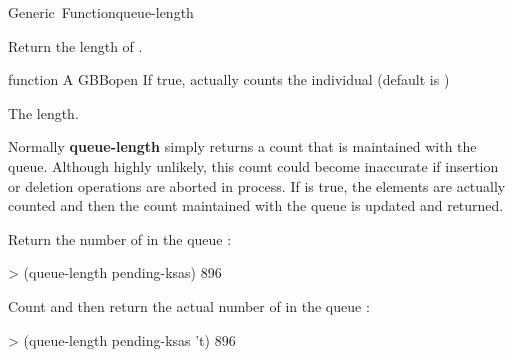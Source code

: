 \documentclass[10pt,twoside,english,pdftex]{article}
\begin{document}
\begin{functiondoc}{Generic~Function}{queue-length}{
      
    \returns{} }
%
%

\fnsyntax

\fnpurpose Return the length of .

\fnmethods
{} 

\fnpackage {}

\fnmodule {}

\fnargs
\begin{args}{function}
\arg[queue] A GBBopen 
\arg[recount-p] If true, actually counts the individual
 (default is \nil) 
\end{args}

\fnreturns The  length.

\fndescription Normally \textbf{queue-length} simply returns a count
that is maintained with the queue.  Although highly unlikely, this
count could become inaccurate if  insertion or
deletion operations are aborted in process. If  is
true, the elements are actually counted and then the count maintained
with the queue is updated and returned.

\fnexamples
Return the number of  in the queue :
%
\W\supp
\begin{example}
> (queue-length pending-ksas)
896
\end{example}
%
Count and then return the actual number of  in the
queue :
%
\W\supp\notpretop
\begin{example}
> (queue-length pending-ksas 't)
896
\end{example}

\end{functiondoc}

\end{document}

